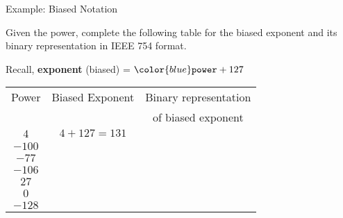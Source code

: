 \begin{frame}{Example: Biased Notation}
    \begin{tcolorbox}[enhanced,attach boxed title to top center={yshift=-3mm,yshifttext=-1mm},
  colback=red!5!white,colframe=red!75!black,colbacktitle=red!80!black,
  title=Try this,fonttitle=\bfseries,
  boxed title style={size=small,colframe=red!50!black} ]

Given the power, complete the following table for the biased exponent and its binary representation in IEEE 754 format. 

Recall, \textbf{exponent} (biased) = ${\color{blue} \texttt{power}} + 127$


\begin{table}[H]
\begin{center}
\begin{tabular}{ |c|c|c|}
    \hline 
    Power   & Biased Exponent  & Binary representation  \\
    & & of biased exponent\\
    \hline\hline
    $4$ & $4 + 127 = 131$ \\ \hline
    $-100$ &   \\ \hline
    $-77$  &     \\ \hline
    $-106$ &    \\ \hline
    $27$   &   \\ \hline
    $0$ & \\\hline
    $-128$ & \\\hline
\end{tabular}
\end{center}
\end{table}
\end{tcolorbox}
\end{frame}


